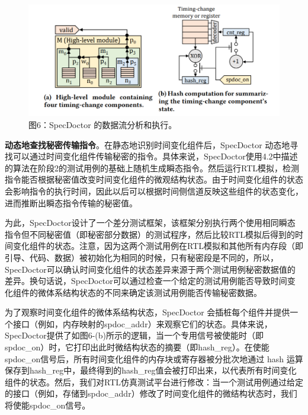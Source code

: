 \begin{figure}[!h]
    \centering
    \includegraphics[width=\linewidth]{figure/proposal/specdoctor-figure6.png}
    \caption*{图6：SpecDoctor 的数据流分析和执行。}
\end{figure}

\textbf{动态地查找秘密传输指令}。在静态地识别时间变化组件后，SpecDoctor 动态地寻找可以通过时间变化组件传输秘密的指令。具体来说，SpecDoctor使用4.2中描述的算法在阶段2的测试用例的基础上随机生成瞬态指令。然后运行RTL模拟，检测指令能否根据秘密值改变时间变化组件的微观结构状态。由于时间变化组件的状态会影响指令的执行时间，因此以后可以根据时间侧信道反映这些组件的状态变化，进而推断出瞬态指令传输的秘密值。\par

为此，SpecDoctor设计了一个差分测试框架，该框架分别执行两个使用相同瞬态指令但不同秘密值（即秘密部分数据）的测试程序，然后比较RTL模拟后得到的时间变化组件的状态。注意，因为这两个测试用例在RTL模拟和其他所有内存段（即引导、代码、数据）被初始化为相同的时候，只有秘密段是不同的，所以，SpecDoctor可以确认时间变化组件的状态差异来源于两个测试用例秘密数据值的差异。换句话说，SpecDoctor可以通过检查一个给定的测试用例能否导致时间变化组件的微体系结构状态的不同来确定该测试用例能否传输秘密数据。\par

为了观察时间变化组件的微体系结构状态，SpecDoctor 会插桩每个组件并提供一个接口（例如，内存映射的spdoc\_addr）来观察它们的状态。具体来说，SpecDoctor提供了如图6-(b)所示的逻辑，当一个专用信号被使能时（即spdoc\_on）时，它打印出此时微结构状态的摘要（即hash\_reg）。在使能spdoc\_on信号后，所有时间变化组件的内存块或寄存器被分批次地通过 hash 运算保存到hash\_reg中，最终得到的hash\_reg值会被打印出来，以代表所有时间变化组件的状态。然后，我们对RTL仿真测试平台进行修改：当一个测试用例通过给定的接口（例如，存储到spdoc\_addr）修改了时间变化组件的微结构状态时，我们将使能spdoc\_on信号。\par

